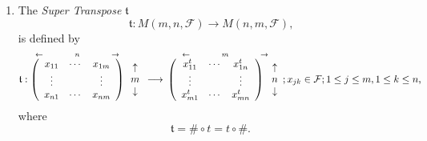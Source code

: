 \documentclass[aps, preprint]{revtex4}
\begin{document}
\begin{enumerate}
\item The \emph{Super Transpose }$\mathfrak{t}$
\begin{equation}\mathfrak{t} :M \left (m ,n ,\mathcal{F}\right ) \rightarrow M \left (n ,m ,\mathcal{F}\right )\text{,}
\end{equation}is defined by
\begin{equation}\mathfrak{t} :\overset{ \leftarrow \text{\quad \quad \quad \quad }n\text{\quad \quad \quad \quad } \rightarrow }{\left (\begin{array}{ccc}x_{1 1} & \cdots  & x_{1 m} \\
\vdots  & \, & \vdots  \\
x_{n 1} & \cdots  & x_{n m}\end{array}\right )}\, \begin{array}{c}\uparrow  \\
m \\
\downarrow \end{array} \longrightarrow \,\overset{ \leftarrow \text{\quad \quad \quad \quad }m\text{\quad \quad \quad \quad } \rightarrow }{\left (\begin{array}{ccc}x_{1 1}^{t} & \cdots  & x_{1 n}^{t} \\
\vdots  & \, & \vdots  \\
x_{m 1}^{t} & \cdots  & x_{m n}^{t}\end{array}\right )\, \begin{array}{c}\uparrow  \\
n \\
\downarrow \end{array}} ;x_{j k} \in \mathcal{F} ;1 \leq j \leq m ,1 \leq k \leq n\text{,}
\end{equation}where
\begin{equation}\mathfrak{t} =\# \circ t =t \circ \#\text{.}
\end{equation}\end{enumerate}
\end{document}
